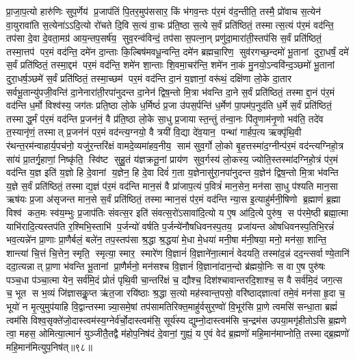 प्रा॒जा॒प॒त्यो हारु॑णिः सुप॒र्णेय॑ प्र॒जाप॑तिं पि॒तर॒मुप॑ससार॒ किं भ॑गव॒न्तः प॑र॒मं व॑द॒न्तीति॒ तस्मै॒ प्रो॑वाच स॒त्येन॑ वा॒युरावा॑ति स॒त्येना॑ऽऽदि॒त्यो रो॑चते दि॒वि स॒त्यं वा॒चः प्र॑ति॒ष्ठा स॒त्ये स॒र्वं प्रति॑ष्ठितं॒ तस्मात्स॒त्यं प॑र॒मं वद॑न्ति॒ तप॑सा दे॒वा दे॒वता॒मग्र॑ आय॒न्तप॒सर्\mbox{}ष॑य॒ सुव॒रन्व॑विन्दं॒ तप॑सा स॒पत्ना॒न् प्रणु॑दा॒मारा॑ती॒स्तप॑सि स॒र्वं प्रति॑ष्ठितं॒ तस्मा॒त्तप॑ पर॒मं वद॑न्ति॒ दमे॑न दा॒न्ताः कि॒ल्बिष॑मवधू॒न्वन्ति॒ दमे॑न ब्रह्मचा॒रिण॒ सुव॑रगच्छ॒न्दमो॑ भू॒तानां दुरा॒धर्\mbox{}षं॒ दमे॑ स॒र्वं प्रति॑ष्ठितं॒ तस्मा॒द्दम॑ पर॒मं वद॑न्ति॒ शमे॑न शा॒न्ताः  शि॒वमा॒चर॑न्ति॒ शमे॑न ना॒कं मु॒नयो॒ऽन्ववि॑न्द॒ञ्छमो॑ भू॒तानां दुरा॒धर्\mbox{}ष॒ञ्छमे॑ स॒र्वं प्रति॑ष्ठितं॒ तस्मा॒च्छम॑ पर॒मं वद॑न्ति दा॒नं य॒ज्ञानां॒ वरू॑थं॒ दक्षि॑णा लो॒के दा॒तार सर्वभू॒तान्यु॑पजी॒वन्ति॑ दा॒नेनारा॑ती॒रपा॑नुदन्त दा॒नेन॑ द्विष॒न्तो मि॒त्रा भ॑वन्ति दा॒ने स॒र्वं प्रति॑ष्ठितं॒ तस्माद्दा॒नं प॑र॒मं वद॑न्ति ध॒र्मो विश्व॑स्य॒ जग॑तः प्रति॒ष्ठा लो॒के ध॒र्मिष्ठं॑ प्र॒जा उ॑पस॒र्पन्ति॑ ध॒र्मेण॑ पा॒पम॑प॒नुद॑ति ध॒र्मे स॒र्वं प्रति॑ष्ठितं॒ तस्माद्ध॒र्मं प॑र॒मं वद॑न्ति प्र॒जन॑नं॒ वै प्र॑ति॒ष्ठा लो॒के सा॒धु प्र॒जायास्त॒न्तुं त॑न्वा॒नः पि॑तृ॒णाम॑नृ॒णो भव॑ति॒ तदे॑व त॒स्यानृ॑णं॒ तस्मात् प्र॒जन॑नं पर॒मं वद॑न्त्य॒ग्नयो॒ वै त्रयी॑ वि॒द्या दे॑व॒यान॒ पन्था॑ गार्\mbox{}हप॒त्य ऋक्पृ॑थि॒वी र॑थन्त॒रम॑न्वाहार्य॒पच॑नो॒ यजु॑र॒न्तरि॑क्षं वामदे॒व्यमा॑हव॒नीय॒ साम॑ सुव॒र्गो लो॒को बृ॒हत्तस्मा॑द॒ग्नीन्प॑र॒मं वद॑न्त्यग्निहो॒त्र सा॑यं प्रा॒तर्गृ॒हाणां॒ निष्कृ॑ति॒ स्वि॑ष्ट सुहु॒तं य॑ज्ञक्रतू॒नां प्राय॑ण सुव॒र्गस्य॑ लो॒कस्य॒ ज्योति॒स्तस्मा॑दग्निहो॒त्रं प॑र॒मं वद॑न्ति य॒ज्ञ इति॑ य॒ज्ञो हि दे॒वानां य॒ज्ञेन॒ हि दे॒वा दिवं॑ ग॒ता य॒ज्ञेनासु॑रा॒नपा॑नुदन्त य॒ज्ञेन॑ द्विष॒न्तो मि॒त्रा भ॑वन्ति य॒ज्ञे स॒र्वं प्रति॑ष्ठितं॒ तस्माद्य॒ज्ञं प॑र॒मं वद॑न्ति मान॒सं वै प्रा॑जाप॒त्यं प॒वित्रं॑ मान॒सेन॒ मन॑सा सा॒धु प॑श्यति मान॒सा ऋष॑यः प्र॒जा अ॑सृजन्त मान॒से स॒र्वं प्रति॑ष्ठितं॒ तस्मान्मान॒सं प॑र॒मं वद॑न्ति न्या॒स इ॒त्याहु॑र्मनी॒षिणो ब्र॒ह्माणं॑ ब्र॒ह्मा विश्व॑ कत॒मः स्व॑य॒म्भुः प्र॒जाप॑तिः संवत्स॒र इति॑ संवत्स॒रो॑ऽसावा॑दि॒त्यो य ए॒ष आ॑दि॒त्ये पुरु॑ष॒ स प॑रमे॒ष्ठी ब्रह्मा॒त्मा याभि॑रादि॒त्यस्तप॑ति र॒श्मिभि॒स्ताभि॑ प॒र्जन्यो॑ वर्\mbox{}षति प॒र्जन्ये॑नौषधिवनस्प॒तय॒ प्रजा॑यन्त ओषधिवनस्प॒तिभि॒रन्नं॑ भव॒त्यन्ने॑न प्रा॒णाः प्रा॒णैर्बलं॒ बले॑न॒ तप॒स्तप॑सा श्र॒द्धा श्र॒द्धया॑ मे॒धा मे॒धया॑ मनी॒षा म॑नी॒षया॒ मनो॒ मन॑सा॒ शान्ति॒ शान्त्या॑ चि॒त्तं चि॒त्तेन॒ स्मृति॒ स्मृत्या॒ स्मार॒ स्मारे॑ण वि॒ज्ञानं॑  वि॒ज्ञाने॑ना॒त्मानं॑ वेदयति॒ तस्मा॑द॒न्नं दद॒न्त्सर्वाण्ये॒तानि॑ ददा॒त्यन्नात् प्रा॒णा भ॑वन्ति भू॒तानां प्रा॒णैर्मनो॒ मन॑सश्च वि॒ज्ञानं॑  वि॒ज्ञाना॑दान॒न्दो ब्र॑ह्मयो॒निः स वा ए॒ष पुरु॑षः पञ्च॒धा प॑ञ्चा॒त्मा येन॒ सर्व॑मि॒दं प्रोतं॑ पृथि॒वी चा॒न्तरि॑क्षं च॒ द्यौश्च॒ दिश॑श्चावान्तरदि॒शाश्च॒ स वै सर्व॑मि॒दं जग॒त्स च॒ भूत स भ॒व्यं जि॑ज्ञासकॢ॒प्त ऋ॑त॒जा रयि॑ष्ठाः  श्र॒द्धा स॒त्यो मह॑स्वान्त॒पसो॒ वरि॑ष्ठाद्ज्ञात्वा॑ तमे॒वं मन॑सा हृ॒दा च॒ भूयो॑ न मृ॒त्युमुप॑याहि वि॒द्वान्तस्मान्न्या॒समे॒षां तप॑सामतिरिक्त॒माहु॑र्वसुर॒ण्वो॑ वि॒भूर॑सि प्रा॒णे त्वमसि॑ सन्धा॒ता ब्रह्मं॑ त्वम॑सि विश्व॒सृक्ते॑जो॒दास्त्वम॑स्य॒ग्नेर्व॑र्चो॒दास्त्वम॑सि॒ सूर्य॑स्य द्युम्नो॒दास्त्वम॑सि च॒न्द्रम॑स उपया॒मगृ॑हीतोऽसि ब्र॒ह्मणे त्वा॒ महस॒ ओमित्या॒त्मानं॑ युञ्जीतै॒तद्वै म॑होप॒निष॑दं दे॒वानां॒ गुह्यं॒ य ए॒वं वेद॑ ब्र॒ह्मणो॑ महि॒मान॑माप्नोति॒ तस्माद्ब्र॒ह्मणो॑ महि॒मान॑मित्युप॒निष॑त्॥९८॥\anuvakamend



